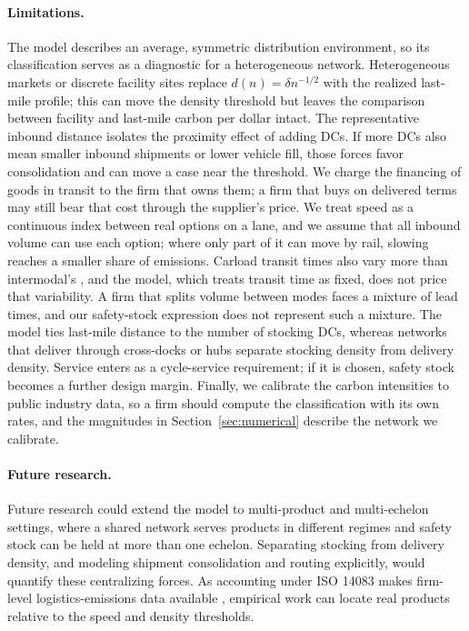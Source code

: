 \documentclass[11pt]{article}
\numberwithin{proposition}{section}
\theoremstyle{definition}
\theoremstyle{remark}
\theoremstyle{plain}
\begin{document}
\paragraph{Limitations.} The model describes an average, symmetric distribution environment, so its
classification serves as a diagnostic for a heterogeneous network. Heterogeneous markets or
discrete facility sites replace $d(n)=\delta n^{-1/2}$ with the realized last-mile profile; this can move the
density threshold but leaves the comparison between facility and last-mile carbon per dollar intact. The representative inbound distance isolates the proximity effect of adding DCs. If more DCs also
mean smaller inbound shipments or lower vehicle fill, those forces favor consolidation and
can move a case near the threshold. We charge the financing of goods in transit to the firm that owns them; a firm that buys on delivered terms may
still bear that cost through the supplier's price. We treat speed as a continuous index between real options on
a lane, and we assume that all inbound volume can use each option; where only part of it can move by rail,
slowing reaches a smaller share of emissions. Carload transit times also vary more than intermodal's
\citep{kwon1995trip}, and the model, which treats transit time as fixed, does not price that variability. A firm that splits volume between modes
faces a mixture of lead times, and our safety-stock expression does not represent such a mixture. The model ties last-mile distance to the number of
stocking DCs, whereas networks that deliver through cross-docks or hubs separate stocking density
from delivery density. Service enters as a cycle-service requirement; if it is chosen, safety stock becomes a
further design margin. Finally, we calibrate the carbon intensities to public industry data, so a firm should compute the
classification with its own rates, and the magnitudes in
Section~\ref{sec:numerical} describe the network we calibrate.

\paragraph{Future research.} Future research could extend the model to multi-product and multi-echelon settings,
where a shared network serves products in different regimes and safety stock can be held at more than one
echelon. Separating stocking from delivery density,
and modeling shipment consolidation and routing explicitly, would quantify these centralizing forces. As accounting under ISO 14083 makes firm-level logistics-emissions data available \citep{iso2023_14083}, empirical
work can locate real products relative to the speed and density thresholds.
\end{document}
